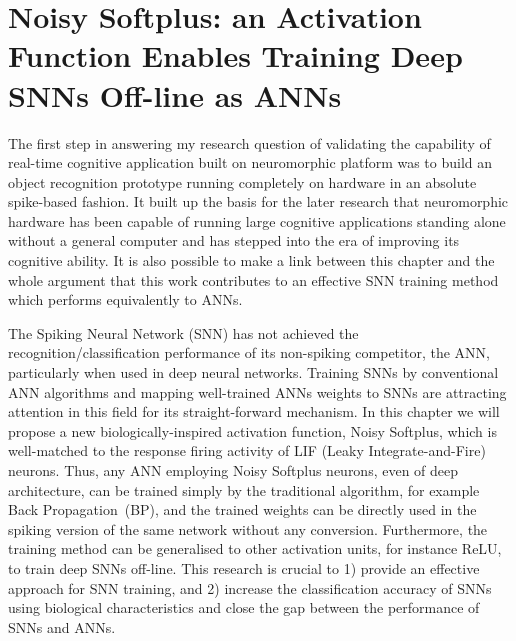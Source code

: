 \chapter{Noisy Softplus: an Activation Function Enables Training Deep SNNs Off-line as ANNs}
\label{cha:Conv}
The first step in answering my research question of validating the capability of real-time cognitive application built on neuromorphic platform was to build an object recognition prototype running completely on hardware in an absolute spike-based fashion.
It built up the basis for the later research that neuromorphic hardware has been capable of running large cognitive applications standing alone without a general computer and has stepped into the era of improving its cognitive ability.
It is also possible to make a link between this chapter and the whole argument that this work contributes to an effective SNN training method which performs equivalently to ANNs.

The Spiking Neural Network (SNN) has not achieved the recognition/classification performance of its non-spiking competitor, the ANN, particularly when used in deep neural networks.
Training SNNs by conventional ANN algorithms and mapping well-trained ANNs weights to SNNs are attracting attention in this field for its straight-forward mechanism.
In this chapter we will propose a new biologically-inspired activation function, Noisy Softplus, which is well-matched to the response firing activity of LIF (Leaky Integrate-and-Fire) neurons.
Thus, any ANN employing Noisy Softplus neurons, even of deep architecture, can be trained simply by the traditional algorithm, for example Back Propagation~(BP), and the trained weights can be directly used in the spiking version of the same network without any conversion.
Furthermore, the training method can be generalised to other activation units, for instance ReLU, to train deep SNNs off-line.
This research is crucial to 1) provide an effective approach for SNN training, and 2) increase the classification accuracy of SNNs using biological characteristics and close the gap between the performance of SNNs and ANNs.


